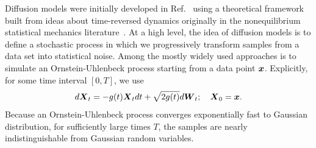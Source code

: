 \documentclass[11pt]{article}
\begin{document}
Diffusion models were initially developed in Ref.~\cite{sohl-dickstein_hamiltonian_2012} using a theoretical framework built from ideas about time-reversed dynamics originally in the nonequilibrium statistical mechanics literature~\cite{crooks_entropy_1999, kurchan_fluctuation_1998, lebowitz_gallavotticohen-type_1999}. 
At a high level, the idea of diffusion models is to define a stochastic process in which we progressively transform samples from a data set into statistical noise.
Among the mostly widely used approaches is to simulate an Ornstein-Uhlenbeck process starting from a data point $\boldsymbol{x}$.
Explicitly, for some time interval $[0, T]$, we use
\begin{equation}
    d\boldsymbol{X}_t = - g(t) \boldsymbol{X}_t dt + \sqrt{2 g(t)} d\boldsymbol{W}_t; \quad \boldsymbol{X}_0 = \boldsymbol{x}.
    \label{eq:ou}
\end{equation}
Because an Ornstein-Uhlenbeck process converges exponentially fast to Gaussian distribution, for sufficiently large times $T$, the samples are nearly indistinguishable from Gaussian random variables. 
\end{document}
